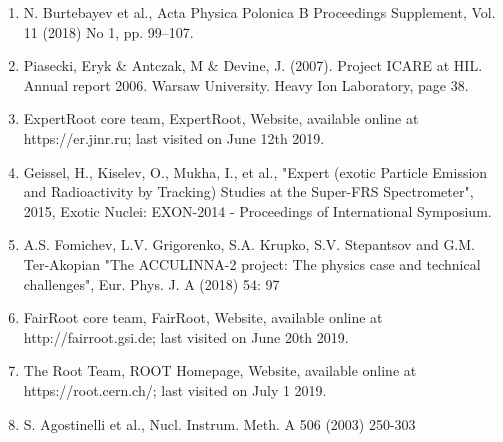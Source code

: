 \documentclass[%
 aip,
cp,  %
 amsmath,amssymb,%
 reprint,%
]{revtex4-2}
\begin{document}
\begin{enumerate}
\item N. Burtebayev et al., Acta Physica Polonica B Proceedings Supplement, Vol. 11 (2018) No 1, pp. 99–107.
\item Piasecki, Eryk & Antczak, M & Devine, J. (2007). Project ICARE at HIL. Annual report 2006. Warsaw University. Heavy       Ion Laboratory, page 38.
\item ExpertRoot core team, ExpertRoot, Website, available online at https://er.jinr.ru; last visited on June 12th 2019.
\item Geissel, H., Kiselev, O., Mukha, I., et al., "Expert (exotic Particle Emission and Radioactivity by Tracking) Studies at the Super-FRS Spectrometer", 2015, Exotic Nuclei: EXON-2014 - Proceedings of International Symposium.
\item A.S. Fomichev, L.V. Grigorenko, S.A. Krupko, S.V. Stepantsov and G.M. Ter-Akopian "The ACCULINNA-2 project: The physics case and technical challenges", Eur. Phys. J. A (2018) 54: 97
\item FairRoot core team, FairRoot, Website, available online at http://fairroot.gsi.de; last visited on June 20th 2019.
\item The Root Team, ROOT Homepage, Website, available online at https://root.cern.ch/; last visited on July 1 2019.
\item S. Agostinelli et al., Nucl. Instrum. Meth. A 506 (2003) 250-303

\end{enumerate}
\end{document}
